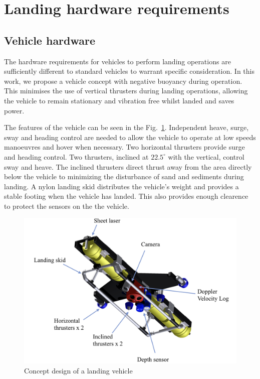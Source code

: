 \section{Landing hardware requirements}

\subsection{Vehicle hardware}
The hardware requirements for vehicles to perform landing operations are sufficiently different to standard vehicles to warrant specific consideration. In this work, we propose a vehicle concept with negative buoyancy during operation. This minimises the use of vertical thrusters during landing operations, allowing the vehicle to remain stationary and vibration free whilst landed and saves power. 

The features of the vehicle can be seen in the Fig.~\ref{f:mehul2}. Independent heave, surge, sway and heading control are needed to allow the vehicle to operate at low speeds manoeuvres and hover when necessary. Two horizontal thrusters provide surge and heading control. Two thrusters, inclined at $22.5^\circ$ with the vertical, control sway and heave. The inclined thrusters direct thrust away from the area directly below the vehicle to minimizing the disturbance of sand and sediments during landing. A nylon landing skid distributes the vehicle's weight and provides a stable footing when the vehicle has landed. This also provides enough clearence to protect the sensors on the the vehicle.

\begin{figure}[!ht]
\centering\includegraphics[width=4.5in]{./images/mehul2.png}
\caption{Concept design of a landing vehicle}
\label{f:mehul2}
\end{figure}

